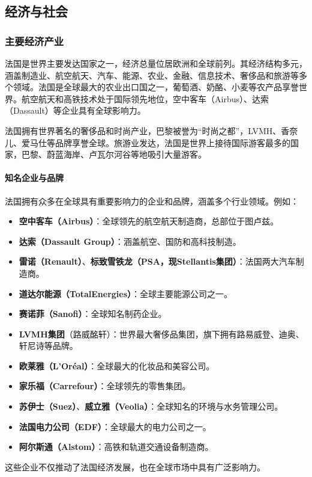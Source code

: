 \subsection{经济与社会}

\subsubsection{主要经济产业}

法国是世界主要发达国家之一，经济总量位居欧洲和全球前列。其经济结构多元，涵盖制造业、航空航天、汽车、能源、农业、金融、信息技术、奢侈品和旅游等多个领域。法国是全球最大的农业出口国之一，葡萄酒、奶酪、小麦等农产品享誉世界。航空航天和高铁技术处于国际领先地位，空中客车（Airbus）、达索（Dassault）等企业具有全球影响力。

法国拥有世界著名的奢侈品和时尚产业，巴黎被誉为“时尚之都”，LVMH、香奈儿、爱马仕等品牌享誉全球。旅游业发达，法国是世界上接待国际游客最多的国家，巴黎、蔚蓝海岸、卢瓦尔河谷等地吸引大量游客。

\paragraph{知名企业与品牌}
法国拥有众多在全球具有重要影响力的企业和品牌，涵盖多个行业领域。例如：
\begin{itemize}
  \item \textbf{空中客车（Airbus）}：全球领先的航空航天制造商，总部位于图卢兹。
  \item \textbf{达索（Dassault Group）}：涵盖航空、国防和高科技制造。
  \item \textbf{雷诺（Renault）}、\textbf{标致雪铁龙（PSA，现Stellantis集团）}：法国两大汽车制造商。
  \item \textbf{道达尔能源（TotalEnergies）}：全球主要能源公司之一。
  \item \textbf{赛诺菲（Sanofi）}：全球知名制药企业。
  \item \textbf{LVMH集团}（路威酩轩）：世界最大奢侈品集团，旗下拥有路易威登、迪奥、轩尼诗等品牌。
  \item \textbf{欧莱雅（L'Oréal）}：全球最大的化妆品和美容公司。
  \item \textbf{家乐福（Carrefour）}：全球领先的零售集团。
  \item \textbf{苏伊士（Suez）}、\textbf{威立雅（Veolia）}：全球知名的环境与水务管理公司。
  \item \textbf{法国电力公司（EDF）}：全球最大的电力公司之一。
  \item \textbf{阿尔斯通（Alstom）}：高铁和轨道交通设备制造商。
\end{itemize}
这些企业不仅推动了法国经济发展，也在全球市场中具有广泛影响力。

